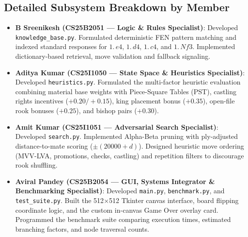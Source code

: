 \documentclass[11pt,a4paper]{article}
\begin{document}
\subsection{Detailed Subsystem Breakdown by Member}
\begin{itemize}[leftmargin=*]
    \item \textbf{B Sreenikesh (CS25B2051 --- Logic \& Rules Specialist)}: Developed \texttt{knowledge\_base.py}. Formulated deterministic FEN pattern matching and indexed standard responses for $1.\,e4$, $1.\,d4$, $1.\,c4$, and $1.\,Nf3$. Implemented dictionary-based retrieval, move validation and fallback signaling.
    \item \textbf{Aditya Kumar (CS25I1050 --- State Space \& Heuristics Specialist)}: Developed \texttt{heuristics.py}. Formulated the multi-factor heuristic evaluation combining material base weights with Piece-Square Tables (PST), castling rights incentives ($+0.20/+0.15$), king placement bonus ($+0.35$), open-file rook bonuses ($+0.25$), and bishop pairs ($+0.30$).
    \item \textbf{Amit Kumar (CS25I1051 --- Adversarial Search Specialist)}: Developed \texttt{search.py}. Implemented Alpha-Beta pruning with ply-adjusted distance-to-mate scoring ($\pm(20000+d)$). Designed heuristic move ordering (MVV-LVA, promotions, checks, castling) and repetition filters to discourage rook shuffling.
    \item \textbf{Aviral Pandey (CS25B2054 --- GUI, Systems Integrator \& Benchmarking Specialist)}: Developed \texttt{main.py}, \texttt{benchmark.py}, and \texttt{test\_suite.py}. Built the 512$\times$512 Tkinter canvas interface, board flipping coordinate logic, and the custom in-canvas Game Over overlay card. Programmed the benchmark suite comparing execution times, estimated branching factors, and node traversal counts.
\end{itemize}
\end{document}
